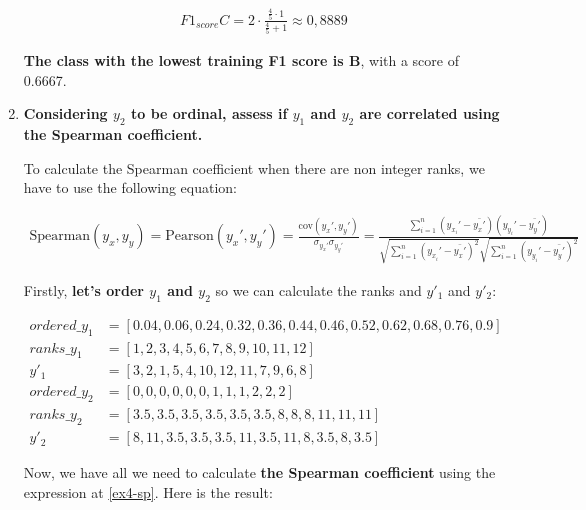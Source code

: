 \documentclass[12pt]{article}
\begin{document}
\begin{enumerate}[leftmargin=\labelsep]
        \[
          \begin{aligned}
            F1_{score} C = 2 \cdot \frac{{ \frac{4}{5} \cdot 1 }}{{ \frac{4}{5} + 1 }} \approx 0,8889
          \end{aligned}
        \]

        \textbf{The class with the lowest training F1 score is B}, with a score of 0.6667.

  \item \textbf{Considering $y_2$ to be ordinal, assess if $y_1$ and $y_2$ are correlated using the Spearman coefficient.}

        \vskip 0.3cm

        To calculate the Spearman coefficient when there are non integer ranks, we have to use the following equation:

        \begin{equation}\label{ex4-sp}
          \begin{split}
            \text{Spearman}(y_x, y_y) = \text{Pearson}(y_x', y_y') = \frac{\text{cov}(y_x', y_y')}{\sigma_{y_x'} \sigma_{y_y'}}
            = \frac{\sum_{i=1}^{n} (y_{x_i}' - \bar{y_x'})(y_{y_i}' - \bar{y_y'})}{\sqrt{\sum_{i=1}^{n} (y_{x_i}' - \bar{y_x'})^2}\sqrt{\sum_{i=1}^{n} (y_{y_i}' - \bar{y_y'})^2}}
          \end{split}
        \end{equation}

        Firstly, \textbf{let's order $y_1$ and $y_2$} so we can calculate the ranks and $y'_1$ and $y'_2$:

        \begin{align*}
          ordered\_y_{1} & = [0.04, 0.06, 0.24, 0.32, 0.36, 0.44, 0.46, 0.52, 0.62, 0.68, 0.76, 0.9] \\
          ranks\_y_{1}   & = [1,2,3,4,5,6,7,8,9,10,11,12]                                            \\
          y'_{1}         & = [3,2,1,5,4,10,12,11,7,9,6,8]                                            \\
          ordered\_y_{2} & = [0,0,0,0,0,0,1,1,1,2,2,2]                                               \\
          ranks\_y_{2}   & = [3.5, 3.5, 3.5, 3.5, 3.5, 3.5, 8, 8, 8, 11, 11, 11]                     \\
          y'_{2}         & = [8, 11, 3.5, 3.5, 3.5, 11, 3.5, 11, 8, 3.5, 8, 3.5]
        \end{align*}

        Now, we have all we need to calculate \textbf{the Spearman coefficient} using the expression at \eqref{ex4-sp}. Here is the result:


\end{enumerate}
\end{document}
